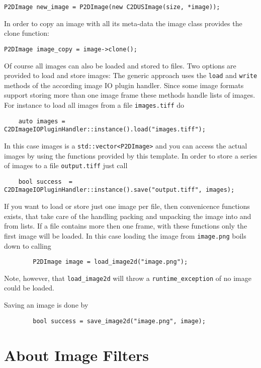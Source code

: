 \documentclass[english, 10pt, a4paper,headsepline,openany]{scrbook}
\begin{document}
\begin{lstlisting}
P2DImage new_image = P2DImage(new C2DUSImage(size, *image));
\end{lstlisting}
 
In order to copy an image with all its meta-data the image class provides the clone function: 
\begin{lstlisting}
P2DImage image_copy = image->clone();
\end{lstlisting}

Of course all images can also be loaded and stored to files. 
Two options are provided to load and store images: 
  The generic approach uses the \texttt{load} and \texttt{write} methods of the according image IO 
    plugin handler. 
  Since some image formats support storing more than one image frame these methods 
    handle lists of images. 
For instance to load all images from a file \texttt{images.tiff} do 
\begin{lstlisting}
	auto images = C2DImageIOPluginHandler::instance().load("images.tiff");
\end{lstlisting}
In this case images is a \texttt{std::vector<P2DImage>} and you can access the actual images by 
  using the functions provided by this template. 
In order to store a series of images to a file \texttt{output.tiff} just call 
\begin{lstlisting}
	bool success  = C2DImageIOPluginHandler::instance().save("output.tiff", images);
\end{lstlisting}


If you want to load or store just one image per file, then convenicence functions exists, 
   that take care of the handling packing and unpacking the image into and from lists. 
If a file contains more then one frame, with these functions only the first image will be loaded. 
In this case loading the image from \texttt{image.png} boils down to calling 
\begin{lstlisting}
        P2DImage image = load_image2d("image.png"); 
\end{lstlisting}
Note, however, that \texttt{load\_image2d} will throw a \texttt{runtime\_exception} of no image 
  could be loaded. 

Saving an image is done by 
\begin{lstlisting}
        bool success = save_image2d("image.png", image); 
\end{lstlisting}


\section{About Image Filters}
\label{sec:filter}
\end{document}
